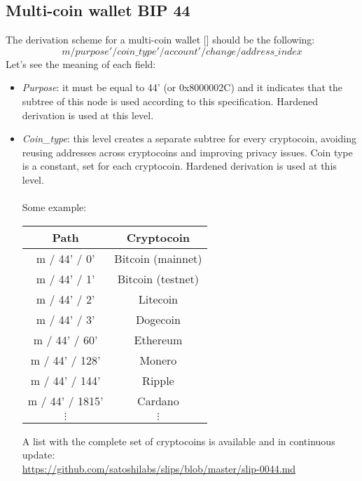 \subsection{Multi-coin wallet BIP 44}
The derivation scheme for a multi-coin wallet [\cite{5}] should be the following:
\begin{equation*}
m / purpose' / coin\_type' / account' / change / address\_index
\end{equation*}
Let's see the meaning of each field:
\begin{itemize}
	\item \textit{Purpose}: it must be equal to 44' (or 0x8000002C)  and it indicates that the subtree of this node is used according to this specification. Hardened derivation is used at this level.
	\item \textit{Coin\_type}: this level creates a separate subtree for every cryptocoin, avoiding reusing addresses across cryptocoins and improving privacy issues. Coin type is a constant, set for each cryptocoin. Hardened derivation is used at this level.
	\\ \\
	Some example:
	\begin{center}
		\begin{tabular}{|| c | c ||} 
			\hline
			Path & Cryptocoin  \\ [0.5ex] 
			\hline\hline
			m / 44' / 0' & Bitcoin (mainnet) \\ 
			m / 44' / 1' & Bitcoin (testnet) \\			
			m / 44' / 2' & Litecoin \\			
			m / 44' / 3' & Dogecoin \\			
			m / 44' / 60' & Ethereum  \\ 
			m / 44' / 128' & Monero  \\
			m / 44' / 144' & Ripple  \\ 
			m / 44' / 1815' & Cardano  \\  
			$\vdots $& $\vdots $  \\ 
			\hline
		\end{tabular}
	\end{center}
	A list with the complete set of cryptocoins is available and in continuous update: \\ \url{https://github.com/satoshilabs/slips/blob/master/slip-0044.md }
	

\end{itemize}
